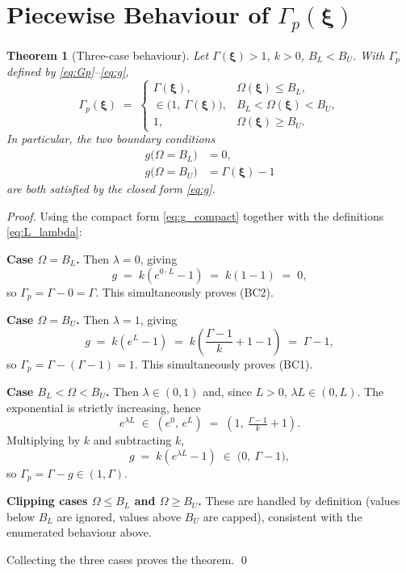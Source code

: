 \documentclass[11pt]{article}
\newtheorem{theorem}{Theorem}
\theoremstyle{remark}
\newcommand{\G}{\Gamma}
\newcommand{\Gp}{\Gamma_p}
\newcommand{\Om}{\Omega}
\newcommand{\xib}{\bm{\xi}}
\begin{document}
\bigskip

\section{Piecewise Behaviour of $\Gp(\xib)$}

\begin{theorem}[Three-case behaviour]
\label{thm:three_cases}
Let $\G(\xib)>1$, $k>0$, $B_L<B_U$. With $\Gp$ defined by \eqref{eq:Gp}--\eqref{eq:g},
\begin{equation*}
    \Gp(\xib) \;=\;
    \begin{cases}
        \G(\xib), & \Om(\xib)\le B_L, \\[2pt]
        \in\bigl(1,\ \G(\xib)\bigr), & B_L<\Om(\xib)<B_U, \\[2pt]
        1, & \Om(\xib)\ge B_U.
    \end{cases}
\end{equation*}
In particular, the two boundary conditions
\begin{align}
    g\bigl(\Om=B_L\bigr) &= 0, \tag{BC2}\\
    g\bigl(\Om=B_U\bigr) &= \G(\xib)-1 \tag{BC1}
\end{align}
are both satisfied by the closed form \eqref{eq:g}.
\end{theorem}

\begin{proof}
Using the compact form \eqref{eq:g_compact} together with the definitions \eqref{eq:L_lambda}:

\smallskip
\noindent\textbf{Case $\Om=B_L$.} Then $\lambda=0$, giving
\[
    g \;=\; k\!\left(e^{0\cdot L}-1\right) \;=\; k(1-1) \;=\; 0,
\]
so $\Gp=\G-0=\G$. This simultaneously proves (BC2).

\smallskip
\noindent\textbf{Case $\Om=B_U$.} Then $\lambda=1$, giving
\[
    g \;=\; k\!\left(e^{L}-1\right)
      \;=\; k\!\left(\frac{\G-1}{k}+1-1\right)
      \;=\; \G-1,
\]
so $\Gp=\G-(\G-1)=1$. This simultaneously proves (BC1).

\smallskip
\noindent\textbf{Case $B_L<\Om<B_U$.} Then $\lambda\in(0,1)$ and, since $L>0$, $\lambda L\in(0,L)$. The exponential is strictly increasing, hence
\[
    e^{\lambda L} \;\in\; (e^{0},\,e^{L}) \;=\; \left(1,\ \tfrac{\G-1}{k}+1\right).
\]
Multiplying by $k$ and subtracting $k$,
\[
    g \;=\; k(e^{\lambda L}-1) \;\in\; \bigl(0,\ \G-1\bigr),
\]
so $\Gp=\G-g\in(1,\G)$.

\smallskip
\noindent\textbf{Clipping cases $\Om\le B_L$ and $\Om\ge B_U$.} These are handled by definition (values below $B_L$ are ignored, values above $B_U$ are capped), consistent with the enumerated behaviour above.

Collecting the three cases proves the theorem. \qed
\end{proof}
\end{document}
